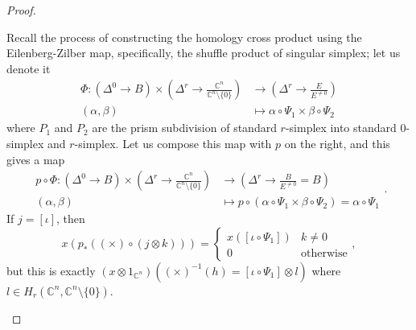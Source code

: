 \documentclass[10pt]{article}
\begin{document}
\begin{proof}
\begin{enumerate}
Recall the process of constructing the homology cross product using the Eilenberg-Zilber map, specifically, the shuffle product of singular simplex; let us denote it
$$\begin{aligned}\Phi:(\Delta^0\to B)\times\left(\Delta^r\to\frac{\mathbb{C}^n}{\mathbb{C}^n\setminus\{0\}}\right)&\to\left(\Delta^r\to\frac{E}{E^{\neq0}}\right)\\
(\alpha,\beta)&\mapsto\alpha\circ\Psi_1\times\beta\circ\Psi_2\end{aligned}$$
where $P_1$ and $P_2$ are the prism subdivision of standard $r$-simplex into standard $0$-simplex and $r$-simplex.
Let us compose this map with $p$ on the right, and this gives a map
$$\begin{aligned}p\circ\Phi:(\Delta^0\to B)\times\left(\Delta^r\to\frac{\mathbb{C}^n}{\mathbb{C}^n\setminus\{0\}}\right)&\to\left(\Delta^r\to\frac{B}{E^{\neq0}}=B\right)\\
(\alpha,\beta)&\mapsto p\circ(\alpha\circ\Psi_1\times\beta\circ\Psi_2)=\alpha\circ\Psi_1\end{aligned}.$$
If $j=[\iota]$, then $$x(p_*((\times)\circ(j\otimes k)))=\begin{cases}x([\iota\circ\Psi_1])&k\neq0\\0&\mbox{otherwise}\end{cases},$$ but this is exactly $(x\otimes 1_{\mathbb{C}^n})((\times)^{-1}(h)=[\iota\circ\Psi_1]\otimes l)$ where $l\in H_r(\mathbb{C}^n,\mathbb{C}^n\setminus\{0\})$.
\end{enumerate}
\end{proof}
\end{document}
